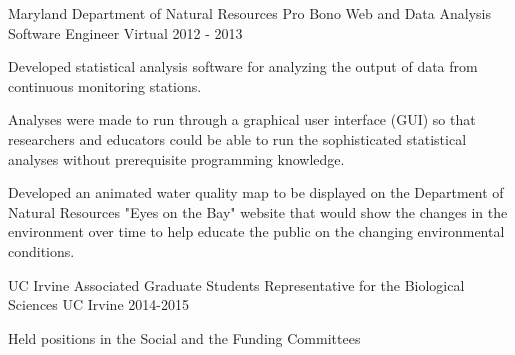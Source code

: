

\begin{cventries}

  \cventry
    {Maryland Department of Natural Resources} %
    {Pro Bono Web and Data Analysis Software Engineer} %
    {Virtual} %
    {2012 - 2013} %
    {
      \begin{cvitems} %
        \item {Developed statistical analysis software for analyzing the output of data from continuous monitoring stations.}
        \item {Analyses were made to run through a graphical user interface (GUI) so that researchers and educators could be able to run the sophisticated statistical analyses without prerequisite programming knowledge.}
        \item {Developed an animated water quality map to be displayed on the Department of Natural Resources "Eyes on the Bay" website that would show the changes in the environment over time to help educate the public on the changing environmental conditions.}
      \end{cvitems}
    }

  \cventry
    {UC Irvine Associated Graduate Students} %
    {Representative for the Biological Sciences} %
    {UC Irvine} %
    {2014-2015} %
    {
      \begin{cvitems} %
        \item {Held positions in the Social and the Funding Committees}
      \end{cvitems}
    }

\end{cventries}

